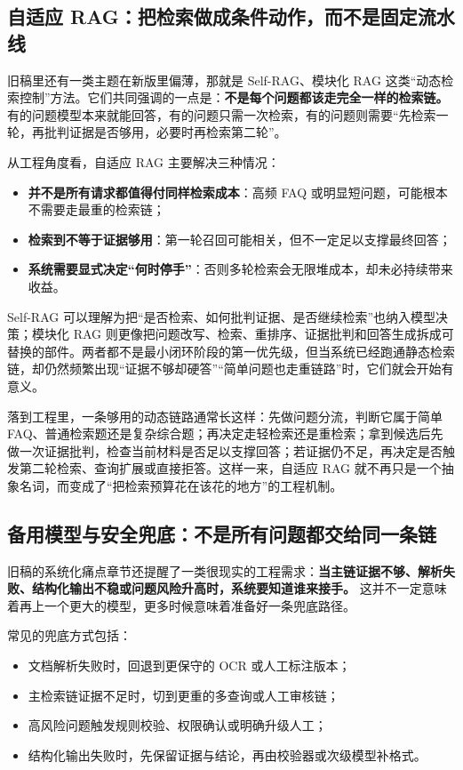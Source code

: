 \subsection{自适应 RAG：把检索做成条件动作，而不是固定流水线}
旧稿里还有一类主题在新版里偏薄，那就是 Self-RAG、模块化 RAG 这类“动态检索控制”方法。它们共同强调的一点是：\textbf{不是每个问题都该走完全一样的检索链。} 有的问题模型本来就能回答，有的问题只需一次检索，有的问题则需要“先检索一轮，再批判证据是否够用，必要时再检索第二轮”。

从工程角度看，自适应 RAG 主要解决三种情况：
\begin{itemize}
  \item \textbf{并不是所有请求都值得付同样检索成本}：高频 FAQ 或明显短问题，可能根本不需要走最重的检索链；
  \item \textbf{检索到不等于证据够用}：第一轮召回可能相关，但不一定足以支撑最终回答；
  \item \textbf{系统需要显式决定“何时停手”}：否则多轮检索会无限堆成本，却未必持续带来收益。
\end{itemize}

Self-RAG 可以理解为把“是否检索、如何批判证据、是否继续检索”也纳入模型决策；模块化 RAG 则更像把问题改写、检索、重排序、证据批判和回答生成拆成可替换的部件。两者都不是最小闭环阶段的第一优先级，但当系统已经跑通静态检索链，却仍然频繁出现“证据不够却硬答”“简单问题也走重链路”时，它们就会开始有意义。

落到工程里，一条够用的动态链路通常长这样：先做问题分流，判断它属于简单 FAQ、普通检索题还是复杂综合题；再决定走轻检索还是重检索；拿到候选后先做一次证据批判，检查当前材料是否足以支撑回答；若证据仍不足，再决定是否触发第二轮检索、查询扩展或直接拒答。这样一来，自适应 RAG 就不再只是一个抽象名词，而变成了“把检索预算花在该花的地方”的工程机制。

\subsection{备用模型与安全兜底：不是所有问题都交给同一条链}
旧稿的系统化痛点章节还提醒了一类很现实的工程需求：\textbf{当主链证据不够、解析失败、结构化输出不稳或问题风险升高时，系统要知道谁来接手。} 这并不一定意味着再上一个更大的模型，更多时候意味着准备好一条兜底路径。

常见的兜底方式包括：
\begin{itemize}
  \item 文档解析失败时，回退到更保守的 OCR 或人工标注版本；
  \item 主检索链证据不足时，切到更重的多查询或人工审核链；
  \item 高风险问题触发规则校验、权限确认或明确升级人工；
  \item 结构化输出失败时，先保留证据与结论，再由校验器或次级模型补格式。
\end{itemize}

